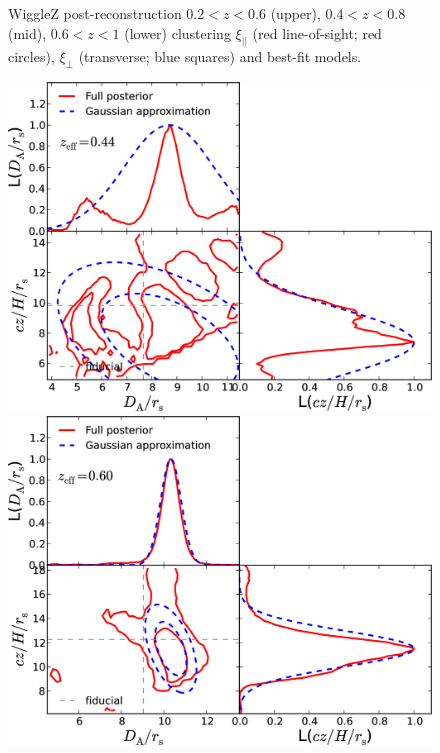 \documentclass[iop,twocolappendix]{emulateapj}
\begin{document}
\begin{figure}[!h]
\begin{center}
\caption{\label{fig:wigglez_wedges_z60}  WiggleZ post-reconstruction $0.2<z<0.6$ (upper), $0.4<z<0.8$ (mid), $0.6<z<1$ (lower) clustering $\xi_{||}$ (red line-of-sight; red circles), $\xi_{\perp}$ (transverse; blue squares) and best-fit models.%
}
\end{center}
\end{figure}


\begin{figure}
\begin{center}
\includegraphics[width=0.9\columnwidth]{figures/stacked_L2D_rpt_wedges_postRec_T0.15_WiggleZ_z0pt2_0pt1/stacked_L2D_rpt_wedges_postRec_T015_WiggleZ_z0pt2_0pt6.png}
\includegraphics[width=0.9\columnwidth]{figures/stacked_L2D_rpt_wedges_postRec_T0.15_WiggleZ_z0pt4_0pt8/stacked_L2D_rpt_wedges_postRec_T015_WiggleZ_z0pt4_0pt8.png}

\end{center}
\end{figure}
\end{document}

